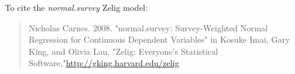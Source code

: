 To cite the \emph{ normal.survey } Zelig model:
 \begin{verse}
 Nicholas Carnes. 2008. "normal.survey: Survey-Weighted Normal Regression for Continuous Dependent Variables" in Kosuke Imai, Gary King, and Olivia Lau, "Zelig: Everyone's Statistical Software,"\url{http://gking.harvard.edu/zelig} 
\end{verse}